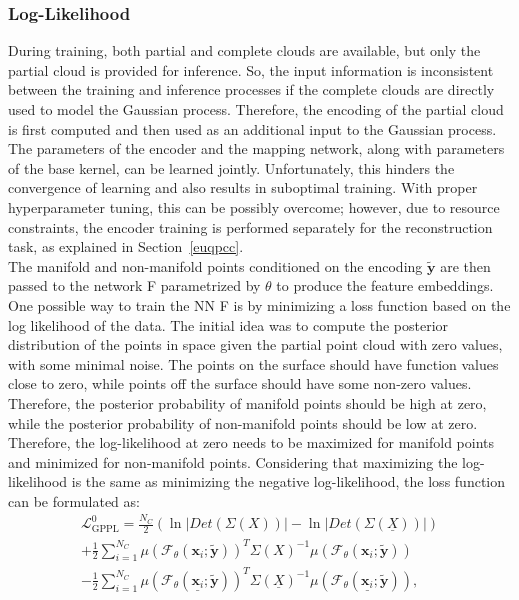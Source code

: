             \subsubsection{Log-Likelihood}
            During training, both partial and complete clouds are available, but only the partial cloud is provided for inference. So, the input information is inconsistent between the
            training and inference processes if the complete clouds are directly used to model the Gaussian process. Therefore, the encoding of the partial cloud is first computed and then used as an additional input to the Gaussian process. The parameters of the encoder and the mapping network, along with parameters of the base kernel, can be learned jointly. Unfortunately, this hinders the convergence of learning and also results in suboptimal training. With proper hyperparameter tuning, this can be possibly overcome; however, due to resource constraints, the encoder training is performed separately for the reconstruction task, as explained in Section~\ref {euqpcc}.  
            \\
            The manifold and non-manifold points conditioned on the encoding $\mathbf{\tilde{y}}$ are then passed to the network F parametrized by $\theta$ to produce the feature embeddings. One possible way to train the NN F is by minimizing a loss function based on the log likelihood of the data. The initial idea was to compute the posterior distribution of the points in space given the partial point cloud with zero values, with some minimal noise. The points on the surface should have function values close to zero, while points off the surface should have some non-zero values. Therefore, the posterior probability of manifold points should be high at zero, while the posterior probability of non-manifold points should be low at zero. Therefore, the log-likelihood at zero needs to be maximized for manifold points and minimized for non-manifold points. Considering that maximizing the log-likelihood is the same as minimizing the negative log-likelihood, the loss function can be formulated as:
            \begin{equation}\label{GPLLLoss1}
                \begin{aligned}
                    \mathcal{L}^0_{\text{GPPL}} = \frac{N_C}{2}(\ln |Det(\Sigma(X))| -\ln |Det(\Sigma(\underline{X}))|)
                    \\
                    + \frac{1}{2}\sum_{i=1}^{N_C} \mu \left(\mathcal{F}_\theta(\mathbf{x}_i; \mathbf{\tilde{y}})\right)^T \Sigma(X)^{-1} \mu\left(\mathcal{F}_\theta(\mathbf{x}_i; \mathbf{\tilde{y}})\right)
                    \\
                    - \frac{1}{2}\sum_{i=1}^{N_C}\mu \left(\mathcal{F}_\theta(\underline{\mathbf{x}_i}; \mathbf{\tilde{y}})\right)^T \Sigma(\underline{X})^{-1} \mu\left(\mathcal{F}_\theta(\underline{\mathbf{x}_i}; \mathbf{\tilde{y}})\right),
                \end{aligned}
            \end{equation}
